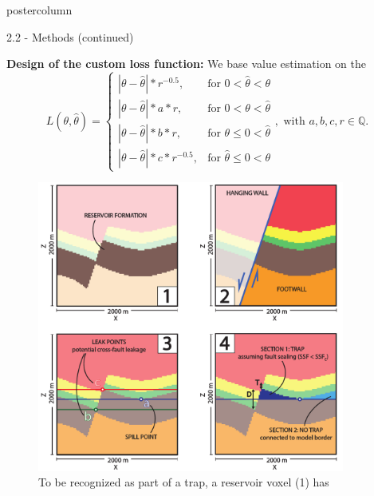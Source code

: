 \documentclass{beamer}
\begin{document}
\begin{frame}
\begin{columns}
\begin{column}{.499\textwidth}
\begin{beamercolorbox}[center]{postercolumn}
\begin{minipage}{.98\textwidth}
{\begin{myblock}{2.2 - Methods (continued)}
								\begin{minipage}[h]{0.598\textwidth} %
								\textbf{Design of the custom loss function:}
								We base value estimation on the 
								\begin{equation}\label{eq:LFR_final}
																L(\theta,\hat{\theta}) =
																\begin{cases}
																|\theta - \hat{\theta}|*r^{-0.5}, & \text{for } 0<\hat{\theta}<\theta  \\
																|\theta-\hat{\theta}|*a*r, & \text{for } 0<\theta<\hat{\theta} \\
																|\theta-\hat{\theta}|*b*r, & \text{for } \theta\leq0<\hat{\theta} \\
																|\theta-\hat{\theta}|*c*r^{-0.5}, & \text{for } \hat{\theta}\leq0<\theta 
																\end{cases},
																\text{ with } a,b,c,r \in \mathbb{Q}.
																\end{equation}
								\end{minipage}
								\begin{minipage}{0.398\textwidth}
								\begin{figure}
									\centering\includegraphics[width=0.9\textwidth]{figures/Trap_Cond_H}
									\caption{To be recognized as part of a trap, a reservoir voxel (1) has
}
\end{figure}
\end{minipage}
\end{myblock}}
\end{minipage}
\end{beamercolorbox}
\end{column}
\end{columns}
\end{frame}
\end{document}
